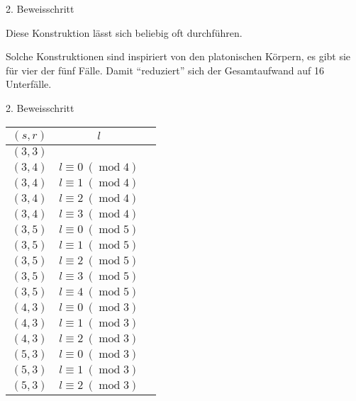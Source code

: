 \documentclass[10pt, notheorems]{beamer}
\renewcommand{\mod}{\operatorname{mod}}
\begin{document}
\begin{frame}[fragile]{2. Beweisschritt}{}
\begin{example}
{
      \par }
    Diese Konstruktion lässt sich beliebig oft durchführen.
  \end{example}
  \pause
  Solche Konstruktionen sind inspiriert von den platonischen Körpern, es gibt sie für vier der fünf Fälle. Damit ``reduziert'' sich der Gesamtaufwand auf 16 Unterfälle.
\end{frame}

\begin{frame}{2. Beweisschritt}
  \begin{tabularx}{\textwidth}{|c|c|X|}
    \hline
    $(s, r)$ & $l$ &\\
    \hline
    $(3, 3)$ & & \\
    $(3, 4)$ & $l \equiv 0~(\mod 4)$ &\\
    $(3, 4)$ & $l \equiv 1~(\mod 4)$ &\\
    $(3, 4)$ & $l \equiv 2~(\mod 4)$ &\\
    $(3, 4)$ & $l \equiv 3~(\mod 4)$ &\\
    $(3, 5)$ & $l \equiv 0~(\mod 5)$ &\\
    $(3, 5)$ & $l \equiv 1~(\mod 5)$ &\\
    $(3, 5)$ & $l \equiv 2~(\mod 5)$ &\\
    $(3, 5)$ & $l \equiv 3~(\mod 5)$ &\\
    $(3, 5)$ & $l \equiv 4~(\mod 5)$ &\\
    $(4, 3)$ & $l \equiv 0~(\mod 3)$ &\\
    $(4, 3)$ & $l \equiv 1~(\mod 3)$ &\\
    $(4, 3)$ & $l \equiv 2~(\mod 3)$ &\\
    $(5, 3)$ & $l \equiv 0~(\mod 3)$ &\\
    $(5, 3)$ & $l \equiv 1~(\mod 3)$ &\\
    $(5, 3)$ & $l \equiv 2~(\mod 3)$ &\\
    \hline
  \end{tabularx}
\end{frame}
\end{document}
